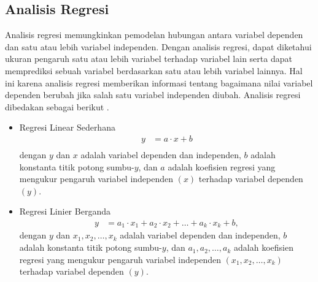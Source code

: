 \begin{spacing}{1.5}
		\subsection[Analisis Regresi]{Analisis Regresi}
		Analisis regresi memungkinkan pemodelan hubungan antara variabel dependen dan satu atau lebih variabel independen. Dengan analisis regresi, dapat diketahui ukuran pengaruh satu atau lebih variabel terhadap variabel lain serta dapat memprediksi sebuah variabel berdasarkan satu atau lebih variabel lainnya. Hal ini karena analisis regresi memberikan informasi tentang bagaimana nilai variabel dependen berubah jika salah satu variabel independen diubah. Analisis regresi dibedakan sebagai berikut  \cite{ANGELINI2019722}.
		\begin{itemize}
			\item Regresi Linear Sederhana
			\begin{equation}
				\begin{aligned}
					y &= a \cdot x+b\\
				\end{aligned}
			\end{equation}
			dengan $y$ dan $x$ adalah variabel dependen dan independen, $b$ adalah konstanta titik potong sumbu-$y$, dan $a$ adalah koefisien regresi yang mengukur pengaruh variabel independen $(x)$ terhadap variabel dependen $(y)$.
			\item Regresi Linier Berganda
			\begin{equation}
				\begin{aligned}
					y &= a_1 \cdot x_1+a_2 \cdot x_2+\dots+a_k \cdot x_k+b,
				\end{aligned}
			\end{equation}
			dengan $y$ dan $x_1,x_2,\dots,x_k$ adalah variabel dependen dan independen, $b$ adalah konstanta titik potong sumbu-$y$, dan $a_1,a_2,\dots,a_k$ adalah koefisien regresi yang mengukur pengaruh variabel independen $(x_1,x_2,\dots,x_k)$ terhadap variabel dependen $(y)$.
		\end{itemize}

\end{spacing}
\vspace{-0.5pc}
